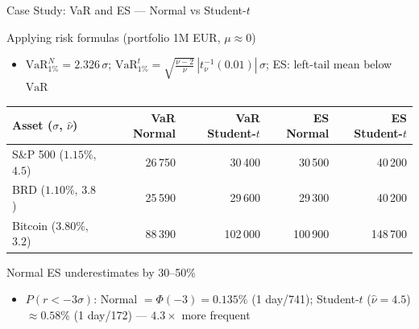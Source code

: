 \documentclass[9pt, aspectratio=169, t]{beamer}
\theoremstyle{definition}
\begin{document}
\begin{frame}{Case Study: VaR and ES --- Normal vs Student-$t$}
    \begin{block}{Applying risk formulas (portfolio 1M EUR, $\mu \approx 0$)}
    \small
    \begin{itemize}\setlength{\itemsep}{0pt}
    \item $\text{VaR}^{N}_{1\%} = 2.326\,\sigma$; \quad $\text{VaR}^{t}_{1\%} = \sqrt{\tfrac{\nu-2}{\nu}}\,|t_\nu^{-1}(0.01)|\,\sigma$; \quad ES: left-tail mean below $\text{VaR}$
    \end{itemize}
    \vspace{0.1cm}

    {\centering
    \renewcommand{\arraystretch}{1.05}
    \footnotesize
    \begin{tabular}{lrrrr}
    \toprule
    \textbf{Asset} ($\sigma$, $\hat{\nu}$) & \textbf{VaR Normal} & \textbf{VaR Student-$t$} & \textbf{ES Normal} & \textbf{ES Student-$t$} \\
    \midrule
    S\&P 500 ($1.15\%$, $4.5$) & 26\,750 & 30\,400 & 30\,500 & 40\,200 \\
    BRD ($1.10\%$, $3.8$)       & 25\,590 & 29\,600 & 29\,300 & 40\,200 \\
    Bitcoin ($3.80\%$, $3.2$)    & 88\,390 & 102\,000 & 100\,900 & 148\,700 \\
    \bottomrule
    \end{tabular}\par}
    \end{block}

    \begin{alertblock}{Normal ES underestimates by 30--50\%}
    \begin{itemize}
        \item $P(r < -3\sigma)$: Normal $= \Phi(-3) = 0.135\%$ (1 day/741); \quad Student-$t$ ($\hat{\nu}\!=\!4.5$) $\approx 0.58\%$ (1 day/172) --- $\mathbf{4.3\times}$ more frequent
    \end{itemize}
    \end{alertblock}
\end{frame}
\end{document}
